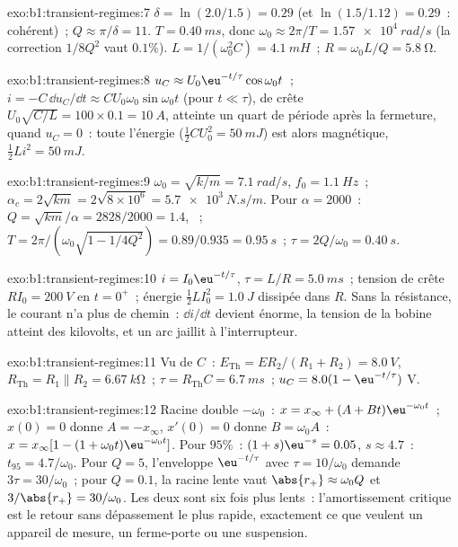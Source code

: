 \begin{solution}{exo:b1:transient-regimes:7}
$\delta = \ln(2.0/1.5) = 0.29$ (et $\ln(1.5/1.12) = 0.29$~: cohérent)~;
$Q \approx \pi/\delta = 11$. $T = \qty{0.40}{ms}$, donc $\omega_0 \approx
2\pi/T = \qty{1.57e4}{rad/s}$ (la correction $1/8Q^2$ vaut $0.1\%$).
$L = 1/(\omega_0^2 C) = \qty{4.1}{mH}$~; $R = \omega_0 L/Q = \qty{5.8}{\ohm}$.
\end{solution}

\begin{solution}{exo:b1:transient-regimes:8}
$u_C \approx U_0\eu^{-t/\tau}\cos\omega_0 t$~; $i = -C\,\dd u_C/\dd t
\approx CU_0\omega_0\sin\omega_0 t$ (pour $t \ll \tau$), de crête $U_0\sqrt{C/L}
= 100 \times 0.1 = \qty{10}{A}$, atteinte un quart de période après la
fermeture, quand $u_C = 0$~: toute l'énergie ($\tfrac12 CU_0^2 = \qty{50}{mJ}$)
est alors magnétique, $\tfrac12 Li^2 = \qty{50}{mJ}$.
\end{solution}

\begin{solution}{exo:b1:transient-regimes:9}
$\omega_0 = \sqrt{k/m} = \qty{7.1}{rad/s}$, $f_0 = \qty{1.1}{Hz}$~;
$\alpha_c = 2\sqrt{km} = 2\sqrt{8\times10^6} = \qty{5.7e3}{N.s/m}$.
Pour $\alpha = 2000$~: $Q = \sqrt{km}/\alpha = 2828/2000 = 1.4$, ~;
$T = 2\pi/(\omega_0\sqrt{1 - 1/4Q^2}) = 0.89/0.935 = \qty{0.95}{s}$~;
$\tau = 2Q/\omega_0 = \qty{0.40}{s}$.
\end{solution}

\begin{solution}{exo:b1:transient-regimes:10}
$i = I_0\eu^{-t/\tau}$, $\tau = L/R = \qty{5.0}{ms}$~; tension de crête
$RI_0 = \qty{200}{V}$ en $t = 0^+$~; énergie $\tfrac12 LI_0^2 = \qty{1.0}{J}$
dissipée dans $R$. Sans la résistance, le courant n'a plus de chemin~:
$\dd i/\dd t$ devient énorme, la tension de la bobine atteint des
kilovolts, et un arc jaillit à l'interrupteur.
\end{solution}

\begin{solution}{exo:b1:transient-regimes:11}
Vu de $C$~: $E_{\mathrm{Th}} = ER_2/(R_1 + R_2) = \qty{8.0}{V}$,
$R_{\mathrm{Th}} = R_1 \parallel R_2 = \qty{6.67}{k\ohm}$~; $\tau =
R_{\mathrm{Th}}C = \qty{6.7}{ms}$~; $u_C = 8.0(1 - \eu^{-t/\tau})$ V.
\end{solution}

\begin{solution}{exo:b1:transient-regimes:12}
Racine double $-\omega_0$~: $x = x_\infty + (A + Bt)\eu^{-\omega_0 t}$~;
$x(0) = 0$ donne $A = -x_\infty$, $x'(0) = 0$ donne $B = \omega_0 A$~:
$x = x_\infty[1 - (1 + \omega_0 t)\eu^{-\omega_0 t}]$. Pour $95\%$~:
$(1 + s)\eu^{-s} = 0.05$, $s \approx 4.7$~: $t_{95} = 4.7/\omega_0$. Pour
$Q = 5$, l'enveloppe $\eu^{-t/\tau}$ avec $\tau = 10/\omega_0$ demande
$3\tau = 30/\omega_0$~; pour $Q = 0.1$, la racine lente vaut $\abs{r_+} \approx
\omega_0 Q$ et $3/\abs{r_+} = 30/\omega_0$. Les deux sont six fois plus
lents~: l'amortissement critique est le retour sans dépassement le plus
rapide, exactement ce que veulent un appareil de mesure, un ferme-porte
ou une suspension.
\end{solution}

